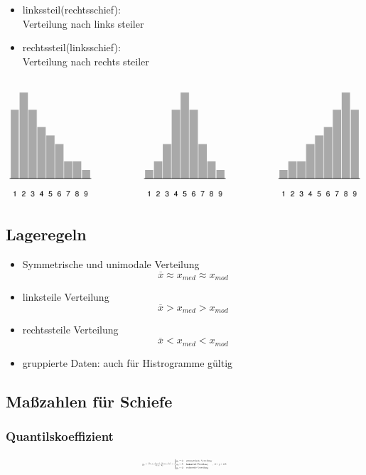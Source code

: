 \documentclass[10pt,a4paper,landscape]{article}
\begin{document}
\begin{multicols}{4}
\begin{itemize}
\item linkssteil(rechtsschief): \\
Verteilung nach links steiler 

\item rechtssteil(linksschief): \\
Verteilung nach rechts steiler
\end{itemize}
\begin{center}
\includegraphics[scale=0.2]{Bilder/SymmetrieSchiefe.png}
\end{center}
 
\subsection{Lageregeln}
\begin{itemize}
\item Symmetrische und unimodale Verteilung
\[
\overline{x}\approx x_{med} \approx x_{mod}
\]
\item linksteile Verteilung
\[
\overline{x} > x_{med} > x_{mod}
\]
\item rechtssteile Verteilung
\[
\overline{x} < x_{med} < x_{mod}
\]
\item gruppierte Daten: auch für Histrogramme gültig
\end{itemize}

\subsection{Maßzahlen für Schiefe}
\subsubsection*{Quantilskoeffizient}
\[\resizebox{0.25\textwidth}{!}{$
g_p = \frac{(\tilde{x}_{1-p} - \tilde{x}_{med}) - (\tilde{x}_{med} - \tilde{x}_p) }{\tilde{x}_{1-p} - \tilde{x}_p} = 
\begin{cases}
g_p = 0 ~&\text{symmetrische Verteilung} \\
g_p > 0 ~&\text{linkssteile Verteilung} \\
g_p < 0 ~&\text{rechtsteile Verteilung} 
\end{cases}, ~0<p<0.5
$}
\]


\end{multicols}
\end{document}
